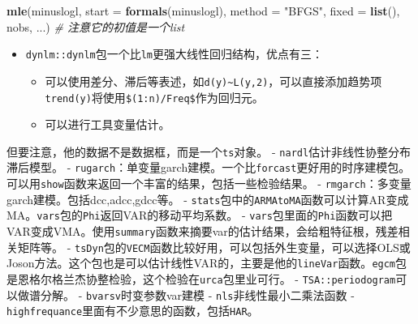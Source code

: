 \documentclass[
]{book}
\newenvironment{Shaded}{\begin{snugshade}}{\end{snugshade}}
\newcommand{\CommentTok}[1]{\textcolor[rgb]{0.56,0.35,0.01}{\textit{#1}}}
\newcommand{\DataTypeTok}[1]{\textcolor[rgb]{0.13,0.29,0.53}{#1}}
\newcommand{\KeywordTok}[1]{\textcolor[rgb]{0.13,0.29,0.53}{\textbf{#1}}}
\newcommand{\NormalTok}[1]{#1}
\newcommand{\StringTok}[1]{\textcolor[rgb]{0.31,0.60,0.02}{#1}}
\providecommand{\tightlist}{%
  \setlength{\itemsep}{0pt}\setlength{\parskip}{0pt}}
\begin{document}
\begin{Shaded}
\begin{Highlighting}[]
\KeywordTok{mle}\NormalTok{(minuslogl, }\DataTypeTok{start =} \KeywordTok{formals}\NormalTok{(minuslogl), }\DataTypeTok{method =} \StringTok{"BFGS"}\NormalTok{,}
    \DataTypeTok{fixed =} \KeywordTok{list}\NormalTok{(), nobs, ...) }\CommentTok{# 注意它的初值是一个list}
\end{Highlighting}
\end{Shaded}

\begin{itemize}
\tightlist
\item
  \texttt{dynlm::dynlm}包一个比\texttt{lm}更强大线性回归结构，优点有三：

  \begin{itemize}
  \tightlist
  \item
    可以使用差分、滞后等表述，如\texttt{d(y)\textasciitilde{}L(y,2)}，可以直接添加趋势项\texttt{trend(y)}将使用\texttt{\$(1:n)/Freq\$}作为回归元。
  \item
    可以进行工具变量估计。
  \end{itemize}
\end{itemize}

但要注意，他的数据不是数据框，而是一个\texttt{ts}对象。
- \texttt{nardl}估计非线性协整分布滞后模型。
- \texttt{rugarch}：单变量garch建模。一个比\texttt{forcast}更好用的时序建模包。可以用\texttt{show}函数来返回一个丰富的结果，包括一些检验结果。
- \texttt{rmgarch}：多变量garch建模。包括dcc,adcc,gdcc等。
- \texttt{stats}包中的\texttt{ARMAtoMA}函数可以计算AR变成MA。\texttt{vars}包的\texttt{Phi}返回VAR的移动平均系数。
- \texttt{vars}包里面的\texttt{Phi}函数可以把VAR变成VMA。使用\texttt{summary}函数来摘要var的估计结果，会给粗特征根，残差相关矩阵等。
- \texttt{tsDyn}包的\texttt{VECM}函数比较好用，可以包括外生变量，可以选择OLS或Joson方法。这个包也是可以估计线性VAR的，主要是他的\texttt{lineVar}函数。\texttt{egcm}包是恩格尔格兰杰协整检验，这个检验在\texttt{urca}包里业可行。
- \texttt{TSA::periodogram}可以做谱分解。
- \texttt{bvarsv}时变参数var建模
- \texttt{nls}非线性最小二乘法函数
- \texttt{highfrequance}里面有不少意思的函数，包括\texttt{HAR}。

  
\end{document}
